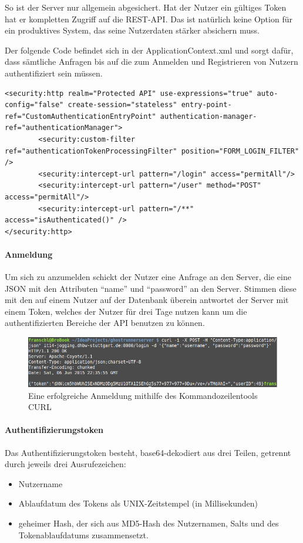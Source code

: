So ist der Server nur allgemein abgesichert. Hat der Nutzer ein gültiges Token hat er kompletten Zugriff auf die REST-API. Das ist natürlich keine Option für ein produktives System, das seine Nutzerdaten stärker absichern muss.

Der folgende Code befindet sich in der ApplicationContext.xml und sorgt dafür, dass sämtliche Anfragen bis auf die zum Anmelden und Registrieren von Nutzern authentifiziert sein müssen.
\lstset{language=xml}
\begin{lstlisting}[frame=htrbl, caption={AuthenticationProcessingFilter}, breaklines=true]
<security:http realm="Protected API" use-expressions="true" auto-config="false" create-session="stateless" entry-point-ref="CustomAuthenticationEntryPoint" authentication-manager-ref="authenticationManager">
        <security:custom-filter ref="authenticationTokenProcessingFilter" position="FORM_LOGIN_FILTER" />
        <security:intercept-url pattern="/login" access="permitAll"/>
        <security:intercept-url pattern="/user" method="POST" access="permitAll"/>
        <security:intercept-url pattern="/**" access="isAuthenticated()" />
</security:http>
\end{lstlisting}
\paragraph{Anmeldung}
Um sich zu anzumelden schickt der Nutzer eine Anfrage an den Server, die eine JSON mit den Attributen ``name'' und ``password'' an den Server. Stimmen diese mit den auf einem Nutzer auf der Datenbank überein antwortet der Server mit einem Token, welches der Nutzer für drei Tage nutzen kann um die authentifizierten Bereiche der API benutzen zu können. 
\begin{figure}[htb]
\centering
\includegraphics[width=\textwidth]{abb/curl_login}
\caption[Anmeldung]{Eine erfolgreiche Anmeldung mithilfe des Kommandozeilentools CURL}
\label{fig:Anmeldung}
\end{figure}
\paragraph{Authentifizierungstoken}
Das Authentifizierungstoken besteht, base64-dekodiert aus drei Teilen, getrennt durch jeweils drei Ausrufezeichen:
\begin{itemize}
\item Nutzername
\item Ablaufdatum des Tokens als UNIX-Zeitstempel (in Millisekunden)
\item geheimer Hash, der sich aus MD5-Hash des Nutzernamen, Salts und des Tokenablaufdatums zusammensetzt.
\end{itemize}

